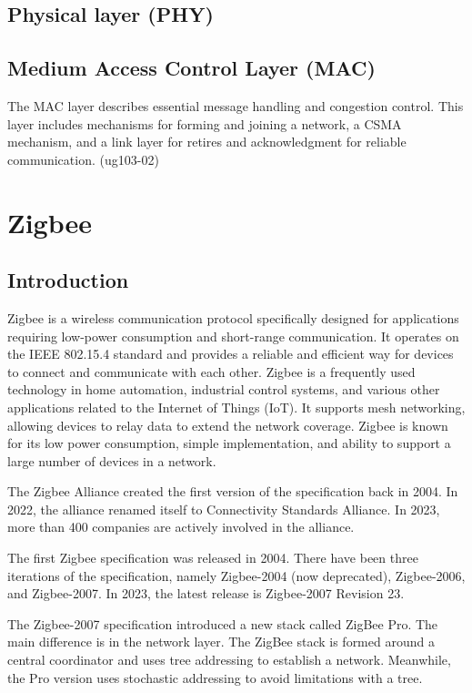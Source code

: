 \subsection{Physical layer (PHY)}

\subsection{Medium Access Control Layer (MAC)}
The MAC layer describes essential message handling and congestion control. This layer includes mechanisms for forming and joining a network, a CSMA mechanism, and a link layer for retires and acknowledgment for reliable communication. (ug103-02)


\section{Zigbee}
\label{sec:zig}

\subsection{Introduction}
\label{zb:into}
Zigbee is a wireless communication protocol specifically designed for
applications requiring low-power consumption and short-range communication.
It operates on the IEEE 802.15.4 standard and provides a reliable and efficient way
for devices to connect and communicate with each other.
Zigbee is a frequently used technology in home automation, industrial control systems,
and various other applications related to the Internet of Things (IoT).
It supports mesh networking, allowing devices to relay data to extend the network
coverage. Zigbee is known for its low power consumption, simple implementation, and
ability to support a large number of devices in a network.

The Zigbee Alliance created the first version of the specification back in 2004.
In 2022, the alliance renamed itself to Connectivity Standards Alliance.
In 2023, more than 400 companies are actively involved in the alliance. \cite{csa:members}

The first Zigbee specification was released in 2004.
There have been three iterations of the specification, namely Zigbee-2004 (now deprecated), Zigbee-2006, and Zigbee-2007.
In 2023, the latest release is Zigbee-2007 Revision 23.

The Zigbee-2007 specification introduced a new stack called ZigBee Pro. The main difference is in the network layer.
The ZigBee stack is formed around a central coordinator and uses tree addressing to establish a network. Meanwhile,
the Pro version uses stochastic addressing to avoid limitations with a tree. \cite{zigbee:silabs:ug103:2}

